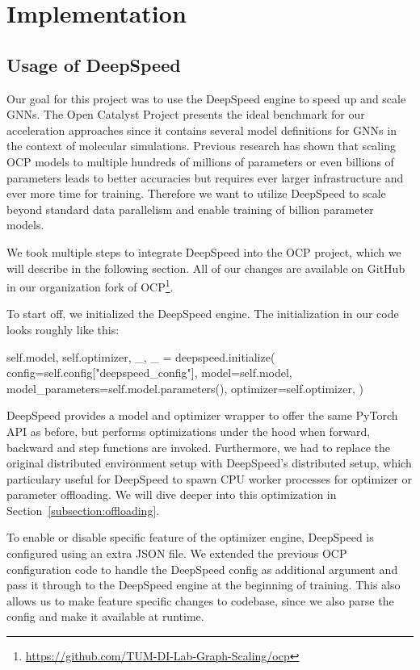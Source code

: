 \section{Implementation}
\label{section:implementation}

\subsection{Usage of DeepSpeed}

Our goal for this project was to use the DeepSpeed engine to speed up and scale 
GNNs. The Open Catalyst Project presents the ideal 
benchmark for our acceleration approaches since it contains several model definitions 
for GNNs in the context of molecular simulations. Previous research has shown 
that scaling OCP models to multiple hundreds of millions of parameters or even 
billions of parameters leads to better accuracies but requires ever larger infrastructure
and ever more time for training. Therefore we want to utilize 
DeepSpeed to scale beyond standard data parallelism and enable training of billion 
parameter models.

We took multiple steps to integrate DeepSpeed into the OCP project, which we will 
describe in the following section. All of our changes are available on GitHub in our 
organization fork of OCP\footnote{\url{https://github.com/TUM-DI-Lab-Graph-Scaling/ocp}}.

To start off, we initialized the DeepSpeed engine. 
The initialization in our code looks roughly like this:

\begin{python}
self.model, self.optimizer, _, _ = deepspeed.initialize(
    config=self.config["deepspeed_config"],
    model=self.model,
    model_parameters=self.model.parameters(),
    optimizer=self.optimizer,
)
\end{python}

DeepSpeed provides a model and optimizer wrapper to offer the same PyTorch API as 
before, but performs optimizations under the hood when forward, backward and step 
functions are invoked. Furthermore, we had to replace the original distributed 
environment setup with DeepSpeed's distributed setup, which particulary useful for 
DeepSpeed to spawn CPU worker processes for optimizer or parameter offloading. We 
will dive deeper into this optimization in Section~\ref{subsection:offloading}.

To enable or disable specific feature of the optimizer engine, DeepSpeed is 
configured using an extra JSON file. We extended the previous OCP configuration 
code to handle the DeepSpeed config as additional argument and pass it through 
to the DeepSpeed engine at the beginning of training. This also allows us to 
make feature specific changes to codebase, since we also parse the config and 
make it available at runtime.

